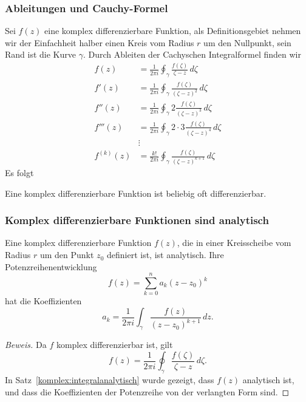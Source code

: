 \subsubsection{Ableitungen und Cauchy-Formel}
Sei $f(z)$ eine komplex differenzierbare Funktion, als Definitionsgebiet
nehmen wir der Einfachheit halber einen Kreis vom Radius $r$ um den Nullpunkt,
sein Rand ist die Kurve $\gamma$.
Durch Ableiten der Cachyschen Integralformel finden wir
\begin{align*}
f(z)
&=
\frac1{2\pi i}\oint_{\gamma}\frac{f(\zeta)}{\zeta-z}\,d\zeta
\\
f'(z)
&=
\frac1{2\pi i}\oint_{\gamma}\frac{f(\zeta)}{(\zeta-z)^2}\,d\zeta
\\
f'' (z)
&=
\frac1{2\pi i}\oint_{\gamma}2\frac{f(\zeta)}{(\zeta-z)^3}\,d\zeta
\\
f'''(z)
&=
\frac1{2\pi i}\oint_{\gamma}2\cdot 3\frac{f(\zeta)}{(\zeta-z)^4}\,d\zeta
\\
&\vdots
\\
f^{(k)}(z)
&=
\frac{k!}{2\pi i}\oint_{\gamma}\frac{f(\zeta)}{(\zeta-z)^{k+1}}\,d\zeta
\end{align*}
Es folgt

\begin{satz}
Eine komplex differenzierbare Funktion ist beliebig oft differenzierbar.
\end{satz}

\subsubsection{Komplex differenzierbare Funktionen sind analytisch}

\begin{satz}
Eine komplex differenzierbare Funktion $f(z)$, die in einer Kreisscheibe
vom Radius $r$ um den Punkt $z_0$ definiert ist, ist analytisch.
Ihre Potenzreihenentwicklung
\[
f(z)=\sum_{k=0}^na_k(z-z_0)^k
\]
hat die Koeffizienten
\[
a_k=\frac1{2\pi i}\int_{\gamma}\frac{f(z)}{(z-z_0)^{k+1}}\,dz.
\]
\end{satz}

\begin{proof}[Beweis]
Da $f$ komplex differenzierbar ist, gilt
\[
f(z)=\frac1{2\pi i}\oint_\gamma \frac{f(\zeta)}{\zeta-z}\,d\zeta.
\]
In Satz~\ref{komplex:integralanalytisch} wurde gezeigt, dass $f(z)$
analytisch ist, und dass die Koeffizienten der Potenzreihe von
der verlangten Form sind.
\end{proof}



